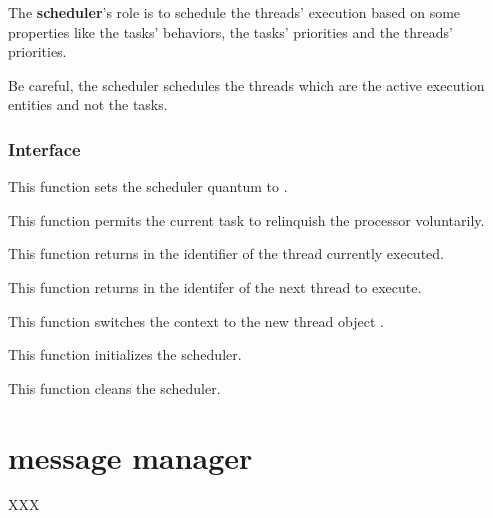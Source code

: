 The \textbf{scheduler}'s role is to schedule the threads' execution
based on some properties like the tasks' behaviors, the tasks' priorities
and the threads' priorities.

Be careful, the scheduler schedules the threads which are the active
execution entities and not the tasks.


%
%

\subsubsection{Interface}

	 {
	   This function sets the scheduler quantum to .
	 }

	 {
	   This function permits the current task to relinquish
	   the processor voluntarily.
	 }

	 {
	   This function returns in  the identifier
	   of the thread currently executed.
	 }

	 {
	   This function returns in  the identifer
	   of the next thread to execute.
	 }

	 {
	   This function switches the context to the new thread object
	   .
	 }

	 {
	   This function initializes the scheduler.
	 }

	 {
	   This function cleans the scheduler.
	 }

%
%

\section{message manager}

XXX
